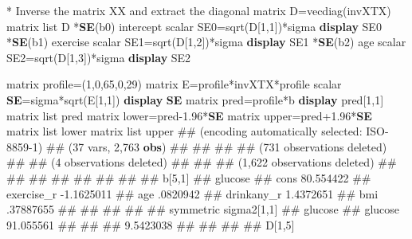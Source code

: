 \documentclass[
  letterpaper,
  DIV=11,
  numbers=noendperiod]{scrreprt}
\newenvironment{Shaded}{\begin{snugshade}}{\end{snugshade}}
\newcommand{\FunctionTok}[1]{\textcolor[rgb]{0.28,0.35,0.67}{#1}}
\newcommand{\KeywordTok}[1]{\textcolor[rgb]{0.00,0.23,0.31}{\textbf{#1}}}
\newcommand{\NormalTok}[1]{\textcolor[rgb]{0.00,0.23,0.31}{#1}}
\newcommand{\OtherTok}[1]{\textcolor[rgb]{0.00,0.23,0.31}{#1}}
\begin{document}
\begin{Shaded}
\begin{Highlighting}[]
\NormalTok{* Inverse the }\FunctionTok{matrix}\NormalTok{ X\textquotesingle{}X and extract the diagonal}
\FunctionTok{matrix}\NormalTok{ D=}\FunctionTok{vecdiag}\NormalTok{(invXTX)}
\FunctionTok{matrix} \OtherTok{list}\NormalTok{ D}
\NormalTok{*}\KeywordTok{SE}\NormalTok{(b0) intercept}
\FunctionTok{scalar}\NormalTok{ SE0=}\FunctionTok{sqrt}\NormalTok{(D[1,1])*sigma}
\KeywordTok{display}\NormalTok{ SE0}
\NormalTok{*}\KeywordTok{SE}\NormalTok{(b1) exercise}
\FunctionTok{scalar}\NormalTok{ SE1=}\FunctionTok{sqrt}\NormalTok{(D[1,2])*sigma}
\KeywordTok{display}\NormalTok{ SE1}
\NormalTok{*}\KeywordTok{SE}\NormalTok{(b2) age}
\FunctionTok{scalar}\NormalTok{ SE2=}\FunctionTok{sqrt}\NormalTok{(D[1,3])*sigma}
\KeywordTok{display}\NormalTok{ SE2}



\FunctionTok{matrix}\NormalTok{ profile=(1,0,65,0,29) }
\FunctionTok{matrix}\NormalTok{ E=profile*invXTX*profile\textquotesingle{}}
\FunctionTok{scalar} \KeywordTok{SE}\NormalTok{=sigma*}\FunctionTok{sqrt}\NormalTok{(E[1,1])}
\KeywordTok{display} \KeywordTok{SE}
\FunctionTok{matrix}\NormalTok{ pred=profile*b}
\KeywordTok{display}\NormalTok{ pred[1,1]    }
\FunctionTok{matrix} \OtherTok{list}\NormalTok{ pred }
\FunctionTok{matrix} \FunctionTok{lower}\NormalTok{=pred{-}1.96*}\KeywordTok{SE}
\FunctionTok{matrix} \FunctionTok{upper}\NormalTok{=pred+1.96*}\KeywordTok{SE}
\FunctionTok{matrix} \OtherTok{list} \FunctionTok{lower}
\FunctionTok{matrix} \OtherTok{list} \FunctionTok{upper} 
\NormalTok{\#\# (encoding automatically selected: ISO{-}8859{-}1)}
\NormalTok{\#\# (37 vars, 2,763 }\KeywordTok{obs}\NormalTok{)}
\NormalTok{\#\# }
\NormalTok{\#\# }
\NormalTok{\#\# }
\NormalTok{\#\# (731 observations deleted)}
\NormalTok{\#\# }
\NormalTok{\#\# (4 observations deleted)}
\NormalTok{\#\# }
\NormalTok{\#\# }
\NormalTok{\#\# (1,622 observations deleted)}
\NormalTok{\#\# }
\NormalTok{\#\# }
\NormalTok{\#\# }
\NormalTok{\#\# }
\NormalTok{\#\# }
\NormalTok{\#\# }
\NormalTok{\#\# }
\NormalTok{\#\# b[5,1]}
\NormalTok{\#\#                glucose}
\NormalTok{\#\#       cons   80.554422}
\NormalTok{\#\# exercise\_r  {-}1.1625011}
\NormalTok{\#\#        age    .0820942}
\NormalTok{\#\# drinkany\_r   1.4372651}
\NormalTok{\#\#        bmi   .37887655}
\NormalTok{\#\# }
\NormalTok{\#\# }
\NormalTok{\#\# }
\NormalTok{\#\# }
\NormalTok{\#\# symmetric sigma2[1,1]}
\NormalTok{\#\#            glucose}
\NormalTok{\#\# glucose  91.055561}
\NormalTok{\#\# }
\NormalTok{\#\# }
\NormalTok{\#\# 9.5423038}
\NormalTok{\#\# }
\NormalTok{\#\# }
\NormalTok{\#\# }
\NormalTok{\#\# D[1,5]}

\end{Highlighting}
\end{Shaded}
\end{document}
